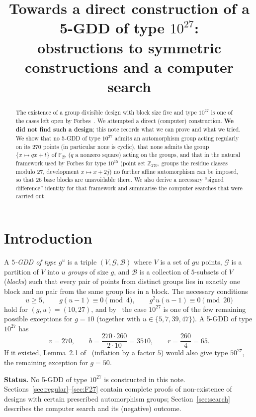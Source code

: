 \documentclass[11pt]{article}
\title{Towards a direct construction of a 5-GDD of type $10^{27}$:\\
obstructions to symmetric constructions and a computer search}
\author{}
\date{}
\theoremstyle{remark}
\newcommand{\Z}{\mathbb{Z}}
\newcommand{\F}{\mathbb{F}}
\begin{document}
\maketitle

\begin{abstract}
The existence of a group divisible design with block size five and type $10^{27}$
is one of the cases left open by Forbes~\cite{Forbes2023}.
We attempted a direct (computer) construction.
\textbf{We did not find such a design}; this note records what we can prove and what we tried.
We show that no 5-GDD of type $10^{27}$ admits an automorphism group acting regularly on
its $270$ points (in particular none is cyclic), that none admits the group
$\{x\mapsto qx+t\}$ of $\F_{27}$ ($q$ a nonzero square) acting on the groups, and that
in the natural framework used by Forbes for type $10^{15}$
(point set $\Z_{270}$, groups the residue classes modulo $27$, development
$x\mapsto x+2j$) no further affine automorphism can be imposed, so that $26$ base blocks
are unavoidable there.  We also derive a necessary ``signed difference'' identity for that
framework and summarise the computer searches that were carried out.
\end{abstract}

\section{Introduction}

A \emph{$5$-GDD of type $g^u$} is a triple $(V,\mathcal G,\mathcal B)$ where $V$ is a set of
$gu$ points, $\mathcal G$ is a partition of $V$ into $u$ \emph{groups} of size $g$, and
$\mathcal B$ is a collection of $5$-subsets of $V$ (\emph{blocks}) such that every pair of
points from distinct groups lies in exactly one block and no pair from the same group lies
in a block.  The necessary conditions
\[
u\ge 5,\qquad g(u-1)\equiv 0 \pmod 4,\qquad g^2u(u-1)\equiv 0 \pmod{20}
\]
hold for $(g,u)=(10,27)$, and by~\cite[Theorem~1.2]{Forbes2023} the case $10^{27}$ is one
of the few remaining possible exceptions for $g=10$ (together with $u\in\{5,7,39,47\}$).
A 5-GDD of type $10^{27}$ has
\[
v=270,\qquad b=\frac{270\cdot 260}{2\cdot 10}=3510,\qquad r=\frac{260}{4}=65 .
\]
If it existed, Lemma~2.1 of~\cite{Forbes2023} (inflation by a factor $5$) would also give
type $50^{27}$, the remaining exception for $g=50$.

\medskip\noindent
\textbf{Status.} No 5-GDD of type $10^{27}$ is constructed in this note.
Sections~\ref{sec:regular}--\ref{sec:F27} contain complete proofs of non-existence of designs
with certain prescribed automorphism groups; Section~\ref{sec:search} describes the
computer search and its (negative) outcome.
\end{document}
